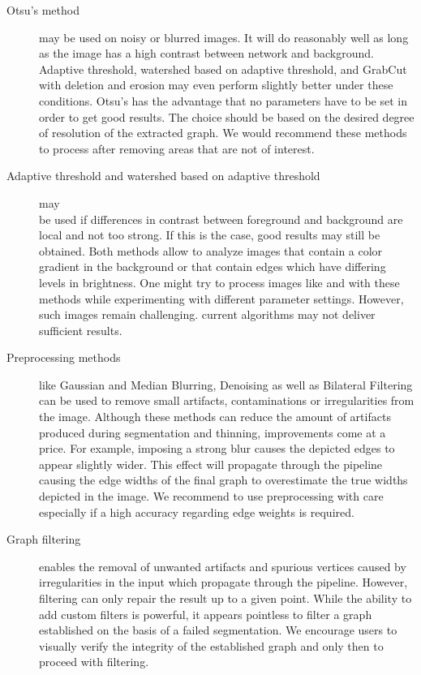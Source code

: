 	\begin{description}
	\item [Otsu's method] may be used on noisy or blurred images. It will do reasonably well as long as the image has a high contrast between network and background. Adaptive threshold, watershed based on adaptive threshold, and GrabCut with deletion and erosion may even perform slightly better under these conditions. Otsu's has the advantage that no parameters have to be set in order to get good results. The choice should be based on the desired degree of resolution of the extracted graph. We would recommend these methods to process  after removing areas that are not of interest.

	\item [Adaptive threshold and watershed based on adaptive threshold] may\\be used if differences in contrast between foreground and background are local and not too strong. If this is the case, good results may still be obtained. Both methods allow to analyze images that contain a color gradient in the background or that contain edges which have differing levels in brightness. One might try to process images like  and  with these methods while experimenting with different parameter settings. However, such images remain challenging. \NEFIs current algorithms may not deliver sufficient results.

	\item [Preprocessing methods] like Gaussian and Median Blurring, Denoising as well as Bilateral Filtering can be used to remove small artifacts, contaminations or irregularities from the image. Although these methods can reduce the amount of artifacts produced during segmentation and thinning, improvements come at a price. For example, imposing a strong blur causes the depicted edges to appear slightly wider. This effect will propagate through the pipeline causing the edge widths of the final graph to overestimate the true widths depicted in the image. We recommend to use preprocessing with care especially if a high accuracy regarding edge weights is required.

	\item[Graph filtering] enables the removal of unwanted artifacts and spurious vertices caused by irregularities in the input which propagate through the pipeline. However, filtering can only repair the result up to a given point. While the ability to add custom filters is powerful, it appears pointless to filter a graph established on the basis of a failed segmentation. We encourage users to visually verify the integrity of the established graph and only then to proceed with filtering.
	\end{description}

